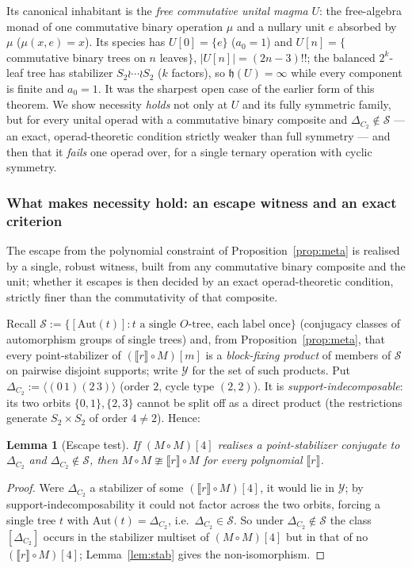 \documentclass[11pt]{amsart}
\theoremstyle{plain}
\newtheorem{lemma}[theorem]{Lemma}
\theoremstyle{definition}
\newcommand{\ext}[1]{\llbracket #1 \rrbracket}
\begin{document}
Its canonical inhabitant is the \emph{free commutative unital magma} $U$: the free-algebra monad of one
commutative binary operation $\mu$ and a nullary unit $e$ absorbed by $\mu$ ($\mu(x,e)=x$). Its species
has $U[0]=\{e\}$ ($a_0=1$) and $U[n]=\{$commutative binary trees on $n$ leaves$\}$, $|U[n]|=(2n-3)!!$; the
balanced $2^k$-leaf tree has stabilizer $S_2\wr\cdots\wr S_2$ ($k$ factors), so $\mathfrak h(U)=\infty$
while every component is finite and $a_0=1$. It was the sharpest open case of the earlier form of this
theorem. We show necessity \emph{holds} not only at $U$ and its fully symmetric family, but for every
unital operad with a commutative binary composite and $\Delta_{C_2}\notin\mathcal S$ --- an exact,
operad-theoretic condition strictly weaker than full symmetry --- and then that it \emph{fails} one operad
over, for a single ternary operation with cyclic symmetry.

\subsubsection*{What makes necessity hold: an escape witness and an exact criterion}
The escape from the polynomial constraint of Proposition~\ref{prop:meta} is realised by a single, robust
witness, built from any commutative binary composite and the unit; whether it escapes is then decided by an
exact operad-theoretic condition, strictly finer than the commutativity of that composite.

Recall $\mathcal S:=\{[\mathrm{Aut}(t)]:t\text{ a single }O\text{-tree, each label once}\}$ (conjugacy
classes of automorphism groups of single trees) and, from Proposition~\ref{prop:meta}, that every
point-stabilizer of $(\ext r\circ M)[m]$ is a \emph{block-fixing product} of members of $\mathcal S$ on
pairwise disjoint supports; write $\mathcal Y$ for the set of such products. Put
$\Delta_{C_2}:=\langle(0\,1)(2\,3)\rangle$ (order $2$, cycle type $(2,2)$). It is
\emph{support-indecomposable}: its two orbits $\{0,1\},\{2,3\}$ cannot be split off as a direct product
(the restrictions generate $S_2\times S_2$ of order $4\ne2$). Hence:

\begin{lemma}[Escape test]\label{lem:escapetest}
If $(M\circ M)[4]$ realises a point-stabilizer conjugate to $\Delta_{C_2}$ and $\Delta_{C_2}\notin\mathcal
S$, then $M\circ M\ncong\ext r\circ M$ for every polynomial $\ext r$.
\end{lemma}

\begin{proof}
Were $\Delta_{C_2}$ a stabilizer of some $(\ext r\circ M)[4]$, it would lie in $\mathcal Y$; by
support-indecomposability it could not factor across the two orbits, forcing a single tree $t$ with
$\mathrm{Aut}(t)=\Delta_{C_2}$, i.e.\ $\Delta_{C_2}\in\mathcal S$. So under $\Delta_{C_2}\notin\mathcal S$
the class $[\Delta_{C_2}]$ occurs in the stabilizer multiset of $(M\circ M)[4]$ but in that of no
$(\ext r\circ M)[4]$; Lemma~\ref{lem:stab} gives the non-isomorphism.
\end{proof}
\end{document}
